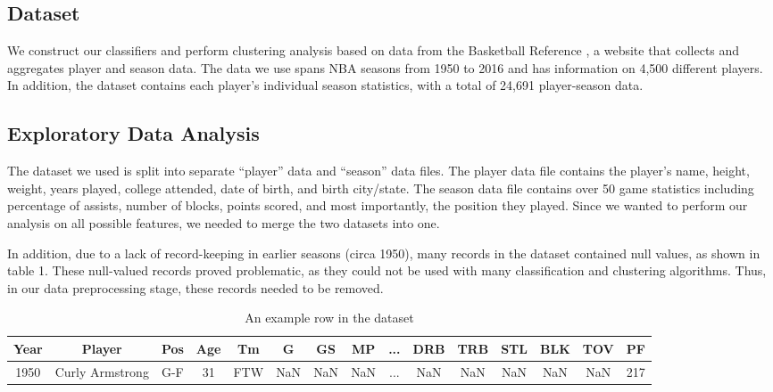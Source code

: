 \documentclass[./main.tex]{subfiles}
\begin{document}
\subsection{Dataset}
We construct our classifiers and perform clustering analysis based on data from the Basketball Reference \cite{goldstein_2018}, a website that collects and aggregates player and season data. The data we use spans NBA seasons from 1950 to 2016 and has information on 4,500 different players. In addition, the dataset contains each player's individual season statistics, with a total of 24,691 player-season data.

\subsection{Exploratory Data Analysis}\label{subsec:eda}
The dataset we used is split into separate ``player'' data and ``season'' data files. The player data file contains the player's name, height, weight, years played, college attended, date of birth, and birth city/state. The season data file contains over 50 game statistics including percentage of assists, number of blocks, points scored, and most importantly, the position they played. Since we wanted to perform our analysis on all possible features, we needed to merge the two datasets into one. 

In addition, due to a lack of record-keeping in earlier seasons (circa 1950), many records in the dataset contained null values, as shown in table 1. These null-valued records proved problematic, as they could not be used with many classification and clustering algorithms. Thus, in our data preprocessing stage, these records needed to be removed.

\begin{table}[H]
\label{tab:dataset-head}
\begin{tabular}{@{}ccccccccccccccc@{}}
\toprule
\textbf{Year} & \textbf{Player} & \textbf{Pos} & \textbf{Age} & \textbf{Tm} & \textbf{G} & \textbf{GS} & \textbf{MP} & \textbf{...} & \textbf{DRB} & \textbf{TRB} & \textbf{STL} & \textbf{BLK} & \textbf{TOV} & \textbf{PF} \\ \midrule
1950          & Curly Armstrong & G-F          & 31           & FTW         & NaN        & NaN         & NaN         & ...          & NaN          & NaN          & NaN          & NaN          & NaN          & 217         \\ \bottomrule
\end{tabular}
\caption{An example row in the dataset}
\end{table}
\end{document}
